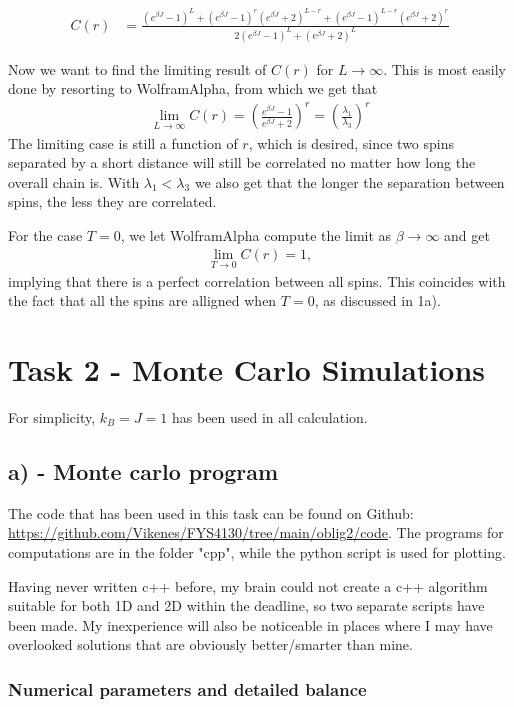 \documentclass[reprint,english,notitlepage,aps,nobalancelastpage,nofootinbib]{revtex4-1}
\newcommand{\closed}[1]{\left(#1\right)}
\newcommand{\ebj}{e^{\beta J}}
\renewcommand{\l}{\lambda}
\begin{document}
\begin{align} \label{eq:corr_func_result}
	C(r) &= \frac{(\ebj-1)^L + (\ebj-1)^r (\ebj+2)^{L-r} + (\ebj-1)^{L-r} (\ebj+2)^r}{2(\ebj-1)^L + (\ebj+2)^L}
\end{align}



Now we want to find the limiting result of $C(r)$ for $L\to\infty$. This is most easily done by resorting to WolframAlpha, from which we get that
\begin{align*}
	\lim_{L\to\infty} C(r) = \closed{\frac{\ebj-1}{\ebj+2}}^r = \closed{\frac{\l_1}{\l_3}}^r
\end{align*}
The limiting case is still a function of $r$, which is desired, since two spins separated by a short distance will still be correlated no matter how long the overall chain is. With $\l_1<\l_3$ we also get that the longer the separation between spins, the less they are correlated. 

For the case $T=0$, we let WolframAlpha compute the limit as $\beta\to\infty$ and get 
\begin{align*}
	\lim_{T\to0} C(r) = 1,
\end{align*}
implying that there is a perfect correlation between all spins. This coincides with the fact that all the spins are alligned when $T=0$, as discussed in 1a). 

\section*{\large Task 2 - Monte Carlo Simulations}

For simplicity, $k_B=J=1$ has been used in all calculation. 

\subsection*{a) - Monte carlo program}
The code that has been used in this task can be found on Github: \url{https://github.com/Vikenes/FYS4130/tree/main/oblig2/code}. The programs for computations are in the folder "cpp", while the python script is used for plotting. 

Having never written c++ before, my brain could not create a c++ algorithm suitable for both 1D and 2D within the deadline, so two separate scripts have been made. My inexperience will also be noticeable in places where I may have overlooked solutions that are obviously better/smarter than mine.    

\subsubsection*{Numerical parameters and detailed balance}
\end{document}
